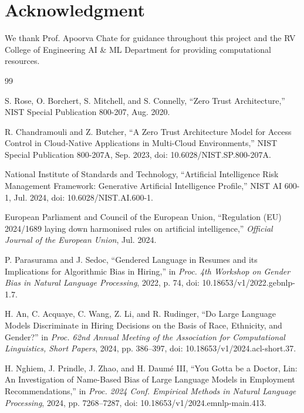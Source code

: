 \documentclass[conference]{IEEEtran}
\begin{document}
\section*{Acknowledgment}

We thank Prof. Apoorva Chate for guidance throughout this project and the RV College of Engineering AI \& ML Department for providing computational resources.

\begin{thebibliography}{99}

S. Rose, O. Borchert, S. Mitchell, and S. Connelly,
``Zero Trust Architecture,''
NIST Special Publication 800-207, Aug. 2020.

R. Chandramouli and Z. Butcher,
``A Zero Trust Architecture Model for Access Control in Cloud-Native Applications in Multi-Cloud Environments,''
NIST Special Publication 800-207A, Sep. 2023, doi: 10.6028/NIST.SP.800-207A.

National Institute of Standards and Technology,
``Artificial Intelligence Risk Management Framework: Generative Artificial Intelligence Profile,''
NIST AI 600-1, Jul. 2024, doi: 10.6028/NIST.AI.600-1.

European Parliament and Council of the European Union,
``Regulation (EU) 2024/1689 laying down harmonised rules on artificial intelligence,''
\emph{Official Journal of the European Union}, Jul. 2024.

P. Parasurama and J. Sedoc,
``Gendered Language in Resumes and its Implications for Algorithmic Bias in Hiring,''
in \emph{Proc. 4th Workshop on Gender Bias in Natural Language Processing}, 2022, p. 74, doi: 10.18653/v1/2022.gebnlp-1.7.

H. An, C. Acquaye, C. Wang, Z. Li, and R. Rudinger,
``Do Large Language Models Discriminate in Hiring Decisions on the Basis of Race, Ethnicity, and Gender?''
in \emph{Proc. 62nd Annual Meeting of the Association for Computational Linguistics, Short Papers}, 2024, pp. 386--397, doi: 10.18653/v1/2024.acl-short.37.

H. Nghiem, J. Prindle, J. Zhao, and H. Daum\'{e} III,
``You Gotta be a Doctor, Lin: An Investigation of Name-Based Bias of Large Language Models in Employment Recommendations,''
in \emph{Proc. 2024 Conf. Empirical Methods in Natural Language Processing}, 2024, pp. 7268--7287, doi: 10.18653/v1/2024.emnlp-main.413.


\end{thebibliography}
\end{document}
